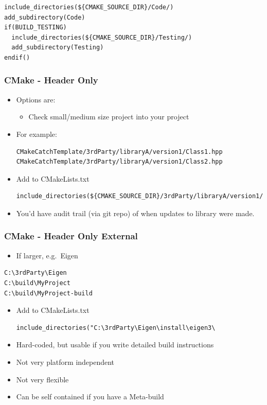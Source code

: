 \begin{verbatim}
include_directories(${CMAKE_SOURCE_DIR}/Code/)
add_subdirectory(Code)
if(BUILD_TESTING)
  include_directories(${CMAKE_SOURCE_DIR}/Testing/)
  add_subdirectory(Testing)
endif()
\end{verbatim}

\subsubsection{CMake - Header Only}\label{cmake---header-only-1}

\begin{itemize}
\item
  Options are:

  \begin{itemize}
  \itemsep1pt\parskip0pt
  \item
    Check small/medium size project into your project
  \end{itemize}
\item
  For example:

\begin{verbatim}
CMakeCatchTemplate/3rdParty/libraryA/version1/Class1.hpp
CMakeCatchTemplate/3rdParty/libraryA/version1/Class2.hpp
\end{verbatim}
\item
  Add to CMakeLists.txt

\begin{verbatim}
include_directories(${CMAKE_SOURCE_DIR}/3rdParty/libraryA/version1/)
\end{verbatim}
\item
  You'd have audit trail (via git repo) of when updates to library were
  made.
\end{itemize}

\subsubsection{CMake - Header Only
External}\label{cmake---header-only-external}

\begin{itemize}
\itemsep1pt\parskip0pt
\item
  If larger, e.g.~Eigen
\end{itemize}

\begin{verbatim}
C:\3rdParty\Eigen
C:\build\MyProject
C:\build\MyProject-build
\end{verbatim}

\begin{itemize}
\item
  Add to CMakeLists.txt

\begin{verbatim}
include_directories("C:\3rdParty\Eigen\install\eigen3\
\end{verbatim}
\item
  Hard-coded, but usable if you write detailed build instructions
\item
  Not very platform independent
\item
  Not very flexible
\item
  Can be self contained if you have a Meta-build
\end{itemize}

